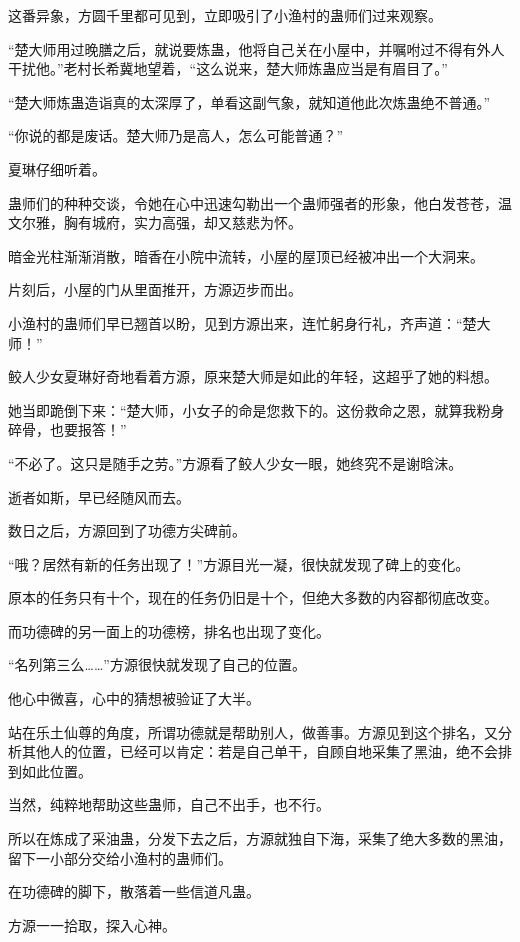 \begin{this_body}
这番异象，方圆千里都可见到，立即吸引了小渔村的蛊师们过来观察。

“楚大师用过晚膳之后，就说要炼蛊，他将自己关在小屋中，并嘱咐过不得有外人干扰他。”老村长希冀地望着，“这么说来，楚大师炼蛊应当是有眉目了。”

“楚大师炼蛊造诣真的太深厚了，单看这副气象，就知道他此次炼蛊绝不普通。”

“你说的都是废话。楚大师乃是高人，怎么可能普通？”

夏琳仔细听着。

蛊师们的种种交谈，令她在心中迅速勾勒出一个蛊师强者的形象，他白发苍苍，温文尔雅，胸有城府，实力高强，却又慈悲为怀。

暗金光柱渐渐消散，暗香在小院中流转，小屋的屋顶已经被冲出一个大洞来。

片刻后，小屋的门从里面推开，方源迈步而出。

小渔村的蛊师们早已翘首以盼，见到方源出来，连忙躬身行礼，齐声道：“楚大师！”

鲛人少女夏琳好奇地看着方源，原来楚大师是如此的年轻，这超乎了她的料想。

她当即跪倒下来：“楚大师，小女子的命是您救下的。这份救命之恩，就算我粉身碎骨，也要报答！”

“不必了。这只是随手之劳。”方源看了鲛人少女一眼，她终究不是谢晗沫。

逝者如斯，早已经随风而去。

数日之后，方源回到了功德方尖碑前。

“哦？居然有新的任务出现了！”方源目光一凝，很快就发现了碑上的变化。

原本的任务只有十个，现在的任务仍旧是十个，但绝大多数的内容都彻底改变。

而功德碑的另一面上的功德榜，排名也出现了变化。

“名列第三么……”方源很快就发现了自己的位置。

他心中微喜，心中的猜想被验证了大半。

站在乐土仙尊的角度，所谓功德就是帮助别人，做善事。方源见到这个排名，又分析其他人的位置，已经可以肯定：若是自己单干，自顾自地采集了黑油，绝不会排到如此位置。

当然，纯粹地帮助这些蛊师，自己不出手，也不行。

所以在炼成了采油蛊，分发下去之后，方源就独自下海，采集了绝大多数的黑油，留下一小部分交给小渔村的蛊师们。

在功德碑的脚下，散落着一些信道凡蛊。

方源一一拾取，探入心神。


\end{this_body}
